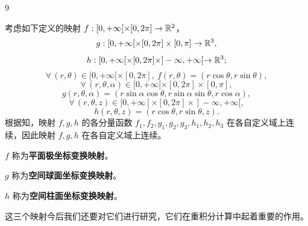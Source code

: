 \begin{sourceexample}{9}

考虑如下定义的映射 $f:[0,+\infty[\times[0,2\pi]\to\mathbb{R}^2$，
\[g:[0,+\infty[\times[0,2\pi]\times[0,\pi]\to\mathbb{R}^3,\]
\[h:[0,+\infty[\times[0,2\pi]\times]-\infty,+\infty[\to\mathbb{R}^3;\]
\[\forall\,(r,\theta)\in[0,+\infty[\times[0,2\pi],\ f(r,\theta)=(r\cos\theta,r\sin\theta),\]
\[\forall\,(r,\theta,\alpha)\in[0,+\infty[\times[0,2\pi]\times[0,\pi],\]
\[g(r,\theta,\alpha)=(r\sin\alpha\cos\theta,r\sin\alpha\sin\theta,r\cos\alpha),\]
\[\forall\,(r,\theta,z)\in[0,+\infty[\times[0,2\pi]\times]-\infty,+\infty[,\]
\[h(r,\theta,z)=(r\cos\theta,r\sin\theta,z).\]
根据知，映射 $f,g,h$ 的各分量函数 $f_1,f_2,g_1,g_2,g_3,h_1,h_2,h_3$ 在各自定义域上连续，因此映射 $f,g,h$ 在各自定义域上连续。

$f$ 称为\textbf{平面极坐标变换映射}。

$g$ 称为\textbf{空间球面坐标变换映射}。

$h$ 称为\textbf{空间柱面坐标变换映射}。

这三个映射今后我们还要对它们进行研究，它们在重积分计算中起着重要的作用。

\end{sourceexample}


